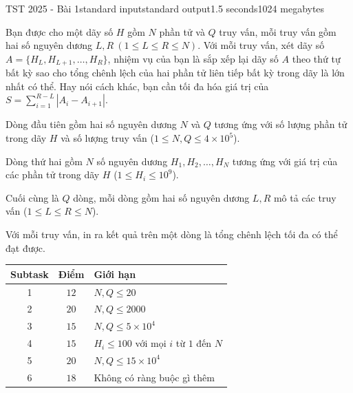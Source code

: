 \begin{problem}{TST 2025 - Bài 1}{standard input}{standard output}{1.5 seconds}{1024 megabytes}

Bạn được cho một dãy số $H$ gồm $N$ phần tử và $Q$ truy vấn, mỗi truy vấn gồm hai số nguyên dương $L,R\ (1\le L\le R\le N)$. Với mỗi truy vấn, xét dãy số $A=\{H_L,H_{L+1},\dots,H_R\}$, nhiệm vụ của bạn là sắp xếp lại dãy số $A$ theo thứ tự bất kỳ sao cho tổng chênh lệch của hai phần tử liên tiếp bất kỳ trong dãy là lớn nhất có thể. Hay nói cách khác, bạn cần tối đa hóa giá trị của $S=\sum_{i=1}^{R-L}|A_i-A_{i+1}|$.

\InputFile
Dòng đầu tiên gồm hai số nguyên dương $N$ và $Q$ tương ứng với số lượng phần tử trong dãy $H$ và số lượng truy vấn ($1\le N,Q\le 4\times 10^5$).

Dòng thứ hai gồm $N$ số nguyên dương $H_1,H_2,\dots,H_N$ tương ứng với giá trị của các phần tử trong dãy $H$ ($1\le H_i\le 10^9$).

Cuối cùng là $Q$ dòng, mỗi dòng gồm hai số nguyên dương $L,R$ mô tả các truy vấn ($1\le L\le R\le N$).


\OutputFile
Với mỗi truy vấn, in ra kết quả trên một dòng là tổng chênh lệch tối đa có thể đạt được.

\Scoring
\begin{center}
  \begin{tabular}{|c|c|l|} \hline
    \textbf{Subtask} & \textbf{Điểm} & \textbf{Giới hạn} \\ \hline
    1 & $12$ & $N,Q\le 20$ \\ \hline
    2 & $20$ & $N,Q\le 2000$ \\ \hline
    3 & $15$ & $N,Q\le 5\times 10^4$ \\ \hline
    4 & $15$ & $H_i\le 100$ với mọi $i$ từ $1$ đến $N$ \\ \hline
    5 & $20$ & $N,Q\le 15\times 10^4$ \\ \hline
    6 & $18$ & Không có ràng buộc gì thêm \\ \hline
  \end{tabular}
\end{center}

\Example

\begin{example}
%
\end{example}

\end{problem}

